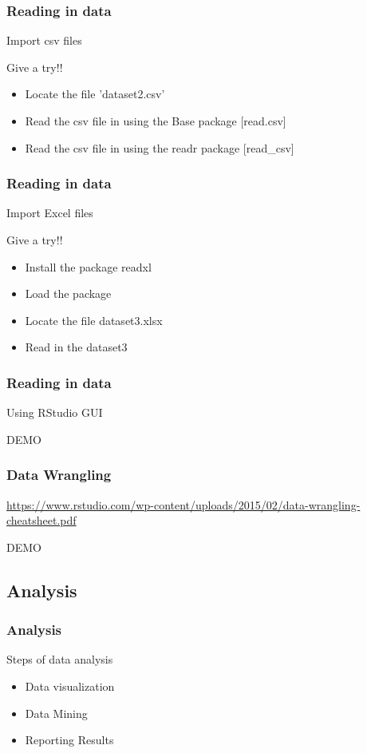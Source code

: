 \documentclass{beamer}
\begin{document}
\begin{frame}[fragile]
	\frametitle{Reading in data}
	\centering \Large Import csv files

	\centering \normalsize Give a try!!
	\begin{itemize}
		\small
		\item Locate the file 'dataset2.csv'
		\item Read the csv file in using the Base package [read.csv]
		\item Read the csv file in using the readr package [read\_csv]
	\end{itemize}
\end{frame}

\begin{frame}[fragile]
	\frametitle{Reading in data}
	\centering \Large Import Excel files

	\centering \normalsize Give a try!!
	\begin{itemize}
		\small
		\item Install the package readxl
		\item Load the package
		\item Locate the file dataset3.xlsx
		\item Read in the dataset3
	\end{itemize}
\end{frame}

\begin{frame}[fragile]
	\frametitle{Reading in data}
	\centering \Large Using RStudio GUI
	\vspace{40pt}

	\begin{center}	\Huge DEMO \end{center}
\end{frame}
\begin{frame}[fragile]
	\frametitle{Data Wrangling}
	\centering \footnotesize \url{https://www.rstudio.com/wp-content/uploads/2015/02/data-wrangling-cheatsheet.pdf}
	\vspace{40pt}

	\begin{center}	\Huge DEMO \end{center}
\end{frame}


\subsection{Analysis}
\begin{frame}[fragile]
	\frametitle{Analysis}
	\centering \Large Steps of data analysis
	\begin{itemize}
		\small
		\item Data visualization
		\item Data Mining
		\item Reporting Results
	\end{itemize}
\end{frame}
\end{document}
